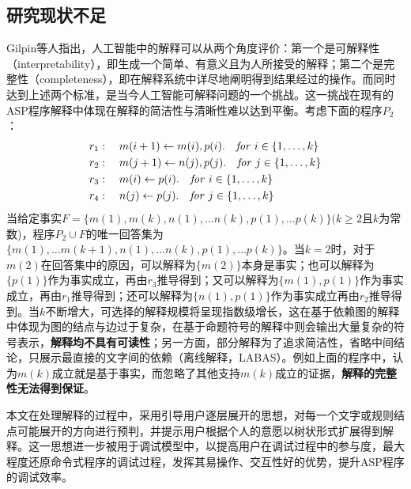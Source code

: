 \subsection{研究现状不足}
Gilpin等人指出，人工智能中的解释可以从两个角度评价：第一个是可解释性（interpretability），即生成一个简单、有意义且为人所接受的解释；第二个是完整性（completeness），即在解释系统中详尽地阐明得到结果经过的操作。而同时达到上述两个标准，是当今人工智能可解释问题的一个挑战\cite{gilpin2018explaining}。这一挑战在现有的ASP程序解释中体现在解释的简洁性与清晰性难以达到平衡。考虑下面的程序$P_2$：
\begin{align}
    &r_1:\quad m(i+1) \leftarrow m(i), p(i).\ \ \  \mathit{for}\ i \in \{1, \ldots, k\} \notag\\ 
    &r_2:\quad m(j+1) \leftarrow n(j), p(j).\ \ \  \mathit{for}\ j \in \{1, \ldots, k\} \notag\\
    &r_3:\quad m(i) \leftarrow p(i).\ \ \  \mathit{for}\ i \in \{1, \ldots, k\}  \notag\\
    &r_4:\quad n(j) \leftarrow p(j).\ \ \  \mathit{for}\ j \in \{1, \ldots, k\} \notag
  \end{align}
当给定事实$F=\{m(1), m(k), n(1), \ldots n(k),p(1), \ldots p(k)\} (k \ge 2$且$k$为常数)，程序$P_2 \cup F$的唯一回答集为$\{m(1), \ldots m(k+1), n(1), \ldots n(k), p(1), \ldots p(k)\}$。当$k=2$时，对于$m(2)$在回答集中的原因，可以解释为$\{m(2)\}$本身是事实；也可以解释为$\{p(1)\}$作为事实成立，再由$r_3$推导得到；又可以解释为$\{m(1),p(1)\}$作为事实成立，再由$r_1$推导得到；还可以解释为$\{n(1),p(1)\}$作为事实成立再由$r_2$推导得到。当$k$不断增大，可选择的解释规模将呈现指数级增长，这在基于依赖图的解释中体现为图的结点与边过于复杂，在基于命题符号的解释中则会输出大量复杂的符号表示，\textbf{解释均不具有可读性}；另一方面，部分解释为了追求简洁性，省略中间结论，只展示最直接的文字间的依赖（离线解释，LABAS）。例如上面的程序中，认为$m(k)$成立就是基于事实，而忽略了其他支持$m(k)$成立的证据，\textbf{解释的完整性无法得到保证}。

本文在处理解释的过程中，采用引导用户逐层展开的思想，对每一个文字或规则结点可能展开的方向进行预判，并提示用户根据个人的意愿以树状形式扩展得到解释。这一思想进一步被用于调试模型中，以提高用户在调试过程中的参与度，最大程度还原命令式程序的调试过程，发挥其易操作、交互性好的优势，提升ASP程序的调试效率。
